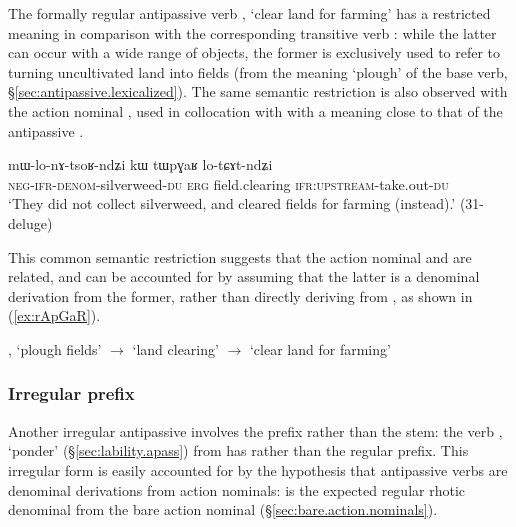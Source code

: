  The formally regular antipassive verb , `clear land for farming' has a restricted meaning in comparison with the corresponding transitive verb  : while the latter can occur with a wide range of objects, the former is exclusively used to refer to turning uncultivated land into fields (from the meaning `plough' of the base verb, §\ref{sec:antipassive.lexicalized}). The same semantic restriction is also observed with the action nominal , used in collocation with  with a meaning close to that of the antipassive .

 \begin{exe}
\ex \label{ex:tWpGaR.lotCAtndZi2}
\gll mɯ-lo-nɤ-tsoʁ-ndʑi kɯ tɯpɣaʁ lo-tɕɤt-ndʑi \\
\textsc{neg}-\textsc{ifr}-\textsc{denom}-silverweed-\textsc{du}  \textsc{erg} field.clearing \textsc{ifr}:\textsc{upstream}-take.out-\textsc{du} \\
\glt `They did not collect silverweed, and cleared fields for farming (instead).' (31-deluge)
\end{exe}

This common semantic restriction suggests that the action nominal  and  are related, and can be accounted for by assuming that the latter is a denominal derivation from the former, rather than directly deriving from , as shown in (\ref{ex:rApGaR}).

\begin{exe}
\ex \label{ex:rApGaR}
\glt {}, `plough fields' $\rightarrow$  `land clearing' $\rightarrow$  `clear land for farming'
\end{exe}
 
\subsubsection{Irregular prefix} \label{sec:antipassive.irr.prefix} 
Another irregular antipassive involves the prefix rather than the stem: the verb , `ponder' (§\ref{sec:lability.apass}) from  has  rather than the regular  prefix. This irregular form is easily accounted for by the hypothesis that antipassive verbs are denominal derivations from action nominals:  is the expected regular rhotic denominal from the bare action nominal   (§\ref{sec:bare.action.nominals}).


